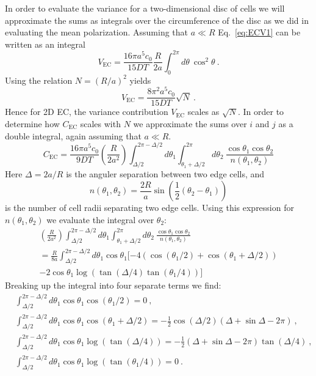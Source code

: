 In order to evaluate the variance for a two-dimensional disc of cells we will approximate the sums as integrals over the circumference of the disc as we did in evaluating the mean polarization. Assuming that $a \ll R$ Eq.\ \ref{eq:ECV1} can be written as an integral
\begin{equation}
    V_\text{EC} = \frac{16\pi a^5c_0}{15DT} \frac{R}{2a} \int_0^{2\pi} d\theta \ \cos^2\theta \ .
\end{equation}
Using the relation $N=(R/a)^2$ yields
\begin{equation}
    V_\text{EC} = \frac{8\pi^2 a^5c_0}{15DT} \sqrt{N} \ .
\end{equation}
Hence for 2D EC, the variance contribution $V_\text{EC}$ scales as $\sqrt{N}$.
In order to determine how $C_\text{EC}$ scales with $N$ we approximate the sums over $i$ and $j$ as a double integral, again assuming that $a \ll R$.
\begin{equation}
    C_\text{EC} = \frac{16\pi a^5c_0}{9DT}
    \left( \frac{R}{2a^2} \right) \int_{\Delta/2}^{2\pi-\Delta/2} d\theta_1 \int_{\theta_1+\Delta/2}^{2\pi} d\theta_2 \ \frac{\cos\theta_1 \cos\theta_2}{n(\theta_1,\theta_2)}
\end{equation}
Here $\Delta = 2a/R$ is the anguler separation between two edge cells, and
\begin{equation*}
    n(\theta_1,\theta_2) = \frac{2R}{a} \sin \left( \frac{1}{2}(\theta_2-\theta_1) \right)
\end{equation*}
is the number of cell radii separating two edge cells. Using this expression for $n(\theta_1,\theta_2)$ we evaluate the integral over $\theta_2$:
\begin{equation}
    \begin{split}
        \left( \frac{R}{2a^2} \right) \int_{\Delta/2}^{2\pi-\Delta/2} d\theta_1 \int_{\theta_1+\Delta/2}^{2\pi} d\theta_2 \ \frac{\cos\theta_1 \cos\theta_2}{n(\theta_1,\theta_2)} \\
        = \frac{R}{8a} \int_{\Delta/2}^{2\pi-\Delta/2} d\theta_1 \cos\theta_1 [ -4\left( \cos(\theta_1/2) + \cos(\theta_1+\Delta/2) \right) \\
        -2 \cos\theta_1 \log\left( \tan(\Delta/4) \tan(\theta_1/4) \right) ]
    \end{split}
\end{equation}
Breaking up the integral into four separate terms we find:
\begin{align*}
    &\int_{\Delta/2}^{2\pi-\Delta/2} d\theta_1 \cos\theta_1 \cos(\theta_1/2) = 0 \ , \\
    &\int_{\Delta/2}^{2\pi-\Delta/2} d\theta_1 \cos\theta_1 \cos(\theta_1+\Delta/2) = -\frac{1}{2}\cos(\Delta/2) (\Delta+\sin\Delta-2\pi) \ , \\
    &\int_{\Delta/2}^{2\pi-\Delta/2} d\theta_1 \cos\theta_1 \log\left( \tan(\Delta/4)\right) = -\frac{1}{2} (\Delta+\sin\Delta-2\pi) \tan(\Delta/4) \ , \\
    &\int_{\Delta/2}^{2\pi-\Delta/2} d\theta_1 \cos\theta_1 \log\left( \tan(\theta_1/4) \right) = 0 \ .
\end{align*}
